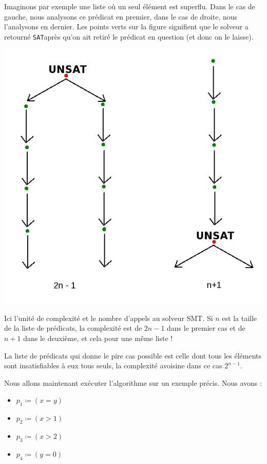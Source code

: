 \documentclass[french]{article}
\newcommand\SAT{\texttt{SAT}}
\begin{document}
  Imaginons par exemple une liste où un seul élément est superflu. Dans le cas de gauche, nous analysons ce prédicat en premier, dans le cas de droite, nous l'analysons en dernier. Les points verts sur la figure signifient que le solveur a retourné \SAT après qu'on ait retiré le prédicat en question (et donc on le laisse).
  
  \begin{center}
    \includegraphics[scale=0.7]{./pictures/alg3_complexity.png}
  \end{center}

  Ici l'unité de complexité et le nombre d'appels au solveur SMT. Si $n$ est la taille de la liste de prédicats, la complexité est de $2n-1$ dans le premier cas et de $n+1$ dans le deuxième, et cela pour une même liste !
  
  La liste de prédicats qui donne le pire cas possible est celle dont tous les éléments sont insatisfiables à eux tous seuls, la complexité avoisine dans ce cas $2^{n-1}$.
  
  \bigbreak
  
  Nous allons maintenant exécuter l'algorithme sur un exemple précis. Nous avons :
  
  \begin{itemize}
    \item $p_1 \coloneqq (x = y)$
    \item $p_2 \coloneqq (x > 1)$
    \item $p_3 \coloneqq (x > 2)$
    \item $p_4 \coloneqq (y = 0)$
  \end{itemize}
\end{document}
